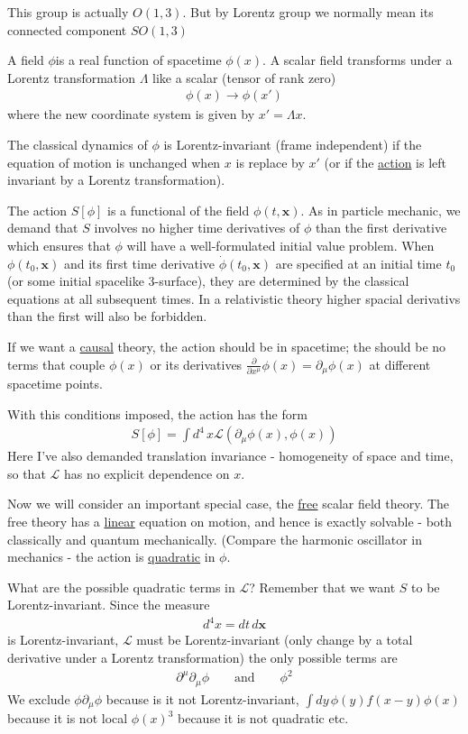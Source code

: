 \documentclass{article}
\begin{document}
This group is actually $O(1,3)$. But by Lorentz group we normally mean its connected component $SO(1,3)$

A field $\phi$is a real function of spacetime $\phi(x)$. A scalar field transforms under a Lorentz transformation $\Lambda$ like a scalar (tensor of rank zero)
\begin{align}
\phi(x)\rightarrow\phi(x')
\end{align}
where the new coordinate system is given by $x'=\Lambda x$.

The classical dynamics of $\phi$ is Lorentz-invariant (frame independent) if the equation of motion is unchanged when $x$ is replace by $x'$ (or if the \underline{action} is left invariant by a Lorentz transformation).

The action $S[\phi]$ is a functional of the field $\phi(t,\mathbf{x})$. As in particle mechanic, we demand that $S$ involves no higher time derivatives of $\phi$ than the first derivative which ensures that $\phi$ will have a well-formulated initial value problem. When $\phi(t_0,\mathbf{x})$ and its first time derivative $\dot{\phi}(t_0,\mathbf{x})$ are specified at an initial time $t_0$ (or some initial spacelike 3-surface), they are determined by the classical equations at all subsequent times. In a relativistic theory higher spacial derivativs than the first will also be forbidden.

If we want a \underline{causal} theory, the action should be in spacetime; the should be no terms that couple $\phi(x)$ or its derivatives $\frac{\partial}{\partial x^\mu}\phi(x)=\partial_\mu\phi(x)$ at different spacetime points.

With this conditions imposed, the action has the form
\begin{align}
S[\phi]=\int d^4\,x\mathcal{L}(\partial_\mu\phi(x),\phi(x))
\end{align}
Here I've also demanded translation invariance - homogeneity of space and time, so that $\mathcal{L}$ has no explicit dependence on $x$.

Now we will consider an important special case, the \underline{free} scalar field theory. The free theory has a \underline{linear} equation on motion, and hence is exactly solvable - both classically and quantum mechanically. (Compare the harmonic oscillator in mechanics - the action is \underline{quadratic} in $\phi$.

What are the possible quadratic terms in $\mathcal{L}$? Remember that we want $S$ to be Lorentz-invariant. Since the measure
\begin{align}
d^4x=dt\,d\mathbf{x}
\end{align}
is Lorentz-invariant, $\mathcal{L}$ must be Lorentz-invariant (only change by a total derivative under a Lorentz transformation) the only possible terms are
\begin{align}
\partial^\mu\partial_\mu\phi\qquad\text{and}\qquad\phi^2
\end{align}
We exclude $\phi\partial_\mu\phi$ because is it not Lorentz-invariant, $\int dy\,\phi(y)f(x-y)\phi(x)$ because it is not local $\phi(x)^3$ because it is not quadratic etc.
\end{document}
